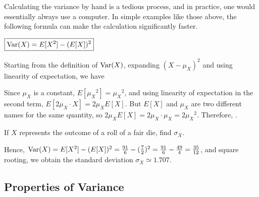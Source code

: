 \par Calculating the variance by hand is a tedious process, and in practice, one would essentially always use a computer. In simple examples like those above, the following formula can make the calculation significantly faster.

\begin{thm}$\boxed{\operatorname{Var}(X) = E[X^2] - (E[X])^2}$
\end{thm}

\begin{pf} Starting from the definition of $\operatorname{Var}(X)$, expanding $(X-\mu_X)^2$ and using linearity of expectation, we have
\par
\noindent Since $\mu_X$ is a constant, $E[{\mu_X}^2] = {\mu_X}^2$, and using linearity of expectation in the second term, $E[2 \mu_X \cdot X] = 2 \mu_X E[X]$. But $E[X]$ and $\mu_X$ are two different names for the same quantity, so $2 \mu_X E[X] = 2 \mu_X \cdot \mu_X = 2 {\mu_X}^2$. Therefore,
.
\end{pf}

\begin{examp}\label{stdevoneroll}
If $X$ represents the outcome of a roll of a fair die, find $\sigma_X$.
\vspace{0.25em}
\par
\noindent Hence, $\operatorname{Var}(X) = E[X^2] - (E[X])^2 = \frac{91}{6} - (\frac{7}{2})^2 = \frac{91}{6} - \frac{49}{4} = \frac{35}{12}$, and square rooting, we obtain the standard deviation $\sigma_X \simeq 1.707$.
\end{examp}

\subsection*{Properties of Variance} 

